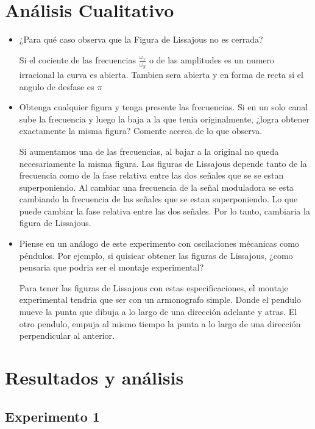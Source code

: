 \documentclass[a4paper, amsfonts, amssymb, amsmath, reprint, showkeys, nofootinbib, twoside]{revtex4-1}
\begin{document}
\section{Análisis Cualitativo}
\begin{itemize}
    \item ¿Para qué caso observa que la Figura de Lissajous no es cerrada?
       
        Si el cociente de las frecuencias $\frac{\omega_{x}}{\omega_y}$ o de las amplitudes es un numero irracional la curva es abierta. Tambien sera abierta y en forma de recta si el angulo de desfase es $\pi$
        
    \item Obtenga cualquier figura y tenga presente las frecuencias. Si en un solo canal sube la frecuencia y luego la baja a la que tenia originalmente, ¿logra obtener exactamente la misma figura? Comente acerca de lo que observa.
        
        Si aumentamos una de las frecuencias, al bajar a la original no queda necesariamente la misma figura. Las figuras de Lissajous depende tanto de la frecuencia como de la fase relativa entre las dos señales que se se estan superponiendo. Al cambiar una frecuencia de la señal moduladora se esta cambiando la frecuencia de las señales que se estan superponiendo. Lo que puede cambiar la fase relativa entre las dos señales. Por lo tanto, cambiaria la figura de Lissajous.
        
    \item Piense en un análogo de este experimento con oscilaciones mécanicas como péndulos. Por ejemplo, si quisiear obtener las figuras de Lissajous, ¿como pensaria que podria ser el montaje experimental?

        Para tener las figuras de Lissajous con estas especificaciones, el montaje experimental tendria que ser con un armonografo simple. Donde el pendulo mueve la punta que dibuja a lo largo de una dirección adelante y atras. El otro pendulo, empuja al mismo tiempo la punta a lo largo de una dirección perpendicular al anterior.

\end{itemize}


\section{Resultados y análisis}

\subsection{Experimento 1}
\end{document}
